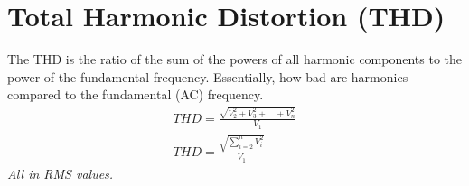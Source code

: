 \section{Total Harmonic Distortion (THD)}

\begin{definition}
    [THD]
    The THD is the ratio of the sum of the powers of all harmonic components to the power of the fundamental frequency. Essentially, how bad are harmonics compared to the fundamental (AC) frequency.
    \begin{align}
        THD = \frac{\sqrt{V_2^2 + V_3^2 + \ldots + V_n^2}}{V_1} \\
        THD = \frac{\sqrt{\sum_{i=2}^{n}V_i^2}}{V_1}
    \end{align}
    \textit{All in RMS values.}
\end{definition}